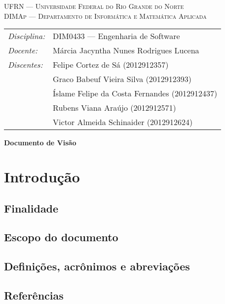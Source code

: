 \documentclass[12pt, a4paper]{article}
\begin{document}
    \begin{center}
      \textsc{UFRN --- Universidade Federal do Rio Grande do Norte} \\
      \textsc{DIMAp --- Departamento de Informática e Matemática Aplicada} \\
    \end{center}

    \bigskip

    \begin{tabular}{@{}ll@{}}
        \emph{Disciplina:} & DIM0433 --- Engenharia de Software \\
        \emph{Docente:}    & Márcia Jacyntha Nunes Rodrigues Lucena \\
        \emph{Discentes:}  & Felipe Cortez de Sá \small{(2012912357)} \\
                           & Graco Babeuf Vieira Silva \small{(2012912393)} \\
                           & Íslame Felipe da Costa Fernandes \small{(2012912437)} \\
                           & Rubens Viana Araújo \small{(2012912571)} \\
                           & Victor Almeida Schinaider \small{(2012912624)}
    \end{tabular}

    \bigskip

    \begin{center}
      \Large\textbf{Documento de Visão}
    \end{center}

    \section{Introdução}
        \subsection{Finalidade}
        \subsection{Escopo do documento}
        \subsection{Definições, acrônimos e abreviações}
        \subsection{Referências}
\end{document}
